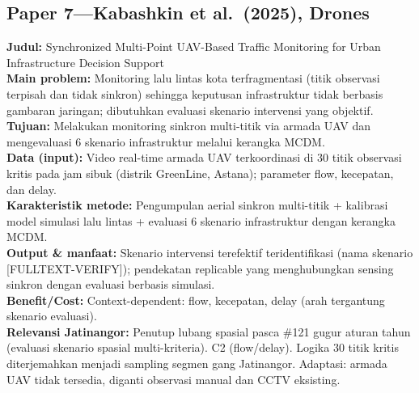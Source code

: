 \documentclass[a4paper,11pt]{article}
\begin{document}
\subsection*{Paper 7---Kabashkin et al.\ (2025), Drones}
\textbf{Judul:} Synchronized Multi-Point UAV-Based Traffic Monitoring for Urban Infrastructure Decision Support\\
\textbf{Main problem:} Monitoring lalu lintas kota terfragmentasi (titik observasi terpisah dan tidak sinkron) sehingga keputusan infrastruktur tidak berbasis gambaran jaringan; dibutuhkan evaluasi skenario intervensi yang objektif.\\
\textbf{Tujuan:} Melakukan monitoring sinkron multi-titik via armada UAV dan mengevaluasi 6 skenario infrastruktur melalui kerangka MCDM.\\
\textbf{Data (input):} Video real-time armada UAV terkoordinasi di 30 titik observasi kritis pada jam sibuk (distrik GreenLine, Astana); parameter flow, kecepatan, dan delay.\\
\textbf{Karakteristik metode:} Pengumpulan aerial sinkron multi-titik + kalibrasi model simulasi lalu lintas + evaluasi 6 skenario infrastruktur dengan kerangka MCDM.\\
\textbf{Output \& manfaat:} Skenario intervensi terefektif teridentifikasi (nama skenario [FULLTEXT-VERIFY]); pendekatan replicable yang menghubungkan sensing sinkron dengan evaluasi berbasis simulasi.\\
\textbf{Benefit/Cost:} Context-dependent: flow, kecepatan, delay (arah tergantung skenario evaluasi).\\
\textbf{Relevansi Jatinangor:} Penutup lubang spasial pasca \#121 gugur aturan tahun (evaluasi skenario spasial multi-kriteria). C2 (flow/delay). Logika 30 titik kritis diterjemahkan menjadi sampling segmen gang Jatinangor. Adaptasi: armada UAV tidak tersedia, diganti observasi manual dan CCTV eksisting.
\end{document}
